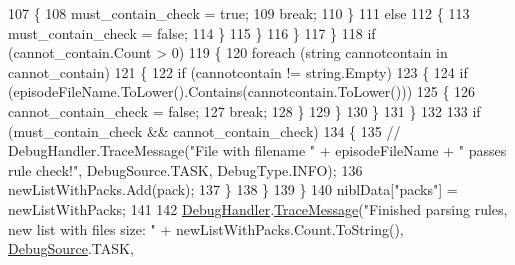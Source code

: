 \begin{DoxyCode}
107                                     \{
108                                         must\_contain\_check = \textcolor{keyword}{true};
109                                         \textcolor{keywordflow}{break};
110                                     \}
111                                     \textcolor{keywordflow}{else}
112                                     \{
113                                         must\_contain\_check = \textcolor{keyword}{false};
114                                     \}
115                                 \}
116                             \}
117                         \}
118                         \textcolor{keywordflow}{if} (cannot\_contain.Count > 0)
119                         \{
120                             \textcolor{keywordflow}{foreach} (\textcolor{keywordtype}{string} cannotcontain \textcolor{keywordflow}{in} cannot\_contain)
121                             \{
122                                 \textcolor{keywordflow}{if} (cannotcontain != \textcolor{keywordtype}{string}.Empty)
123                                 \{
124                                     \textcolor{keywordflow}{if} (episodeFileName.ToLower().Contains(cannotcontain.ToLower()))
125                                     \{
126                                         cannot\_contain\_check = \textcolor{keyword}{false};
127                                         \textcolor{keywordflow}{break};
128                                     \}
129                                 \}
130                             \}
131                         \}
132 
133                         \textcolor{keywordflow}{if} (must\_contain\_check && cannot\_contain\_check)
134                         \{
135                            \textcolor{comment}{// DebugHandler.TraceMessage("File with filename " + episodeFileName + " passes
       rule check!", DebugSource.TASK, DebugType.INFO);}
136                             newListWithPacks.Add(pack);
137                         \}
138                     \}
139                 \}
140                 niblData[\textcolor{stringliteral}{"packs"}] = newListWithPacks;
141 
142                 \mbox{\hyperlink{class_little_weeb_library_1_1_handlers_1_1_anime_rule_handler_a6ad89134d97d818f3b2deebb7e2cf361}{DebugHandler}}.\mbox{\hyperlink{interface_little_weeb_library_1_1_handlers_1_1_i_debug_handler_a2e405bc3492e683cd3702fae125221bc}{TraceMessage}}(\textcolor{stringliteral}{"Finished parsing rules, new list with
       files size: "} + newListWithPacks.Count.ToString(), \mbox{\hyperlink{namespace_little_weeb_library_1_1_handlers_a2a6ca0775121c9c503d58aa254d292be}{DebugSource}}.TASK, 

\end{DoxyCode}
